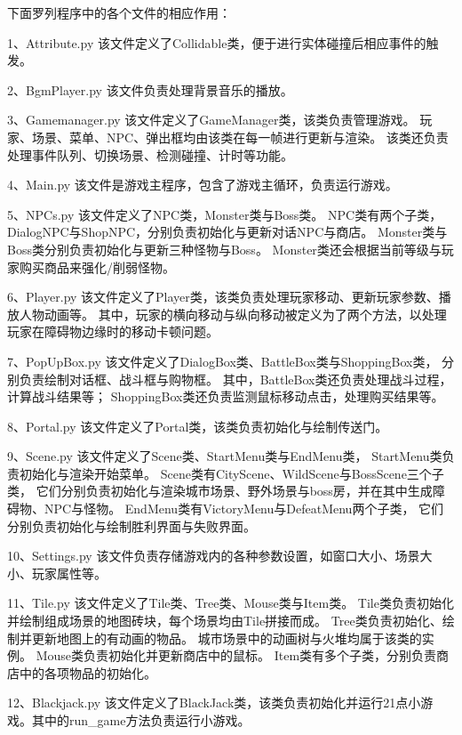 \documentclass{ctexart}
\begin{document}
下面罗列程序中的各个文件的相应作用：

    1、Attribute.py
      该文件定义了Collidable类，便于进行实体碰撞后相应事件的触发。

    2、BgmPlayer.py
      该文件负责处理背景音乐的播放。

    3、Gamemanager.py
      该文件定义了GameManager类，该类负责管理游戏。
      玩家、场景、菜单、NPC、弹出框均由该类在每一帧进行更新与渲染。
      该类还负责处理事件队列、切换场景、检测碰撞、计时等功能。

    4、Main.py
      该文件是游戏主程序，包含了游戏主循环，负责运行游戏。

    5、NPCs.py
      该文件定义了NPC类，Monster类与Boss类。
      NPC类有两个子类，DialogNPC与ShopNPC，分别负责初始化与更新对话NPC与商店。
      Monster类与Boss类分别负责初始化与更新三种怪物与Boss。
      Monster类还会根据当前等级与玩家购买商品来强化/削弱怪物。

    6、Player.py
      该文件定义了Player类，该类负责处理玩家移动、更新玩家参数、播放人物动画等。
      其中，玩家的横向移动与纵向移动被定义为了两个方法，以处理玩家在障碍物边缘时的移动卡顿问题。

    7、PopUpBox.py
      该文件定义了DialogBox类、BattleBox类与ShoppingBox类，
      分别负责绘制对话框、战斗框与购物框。
      其中，BattleBox类还负责处理战斗过程，计算战斗结果等；
      ShoppingBox类还负责监测鼠标移动点击，处理购买结果等。

    8、Portal.py
      该文件定义了Portal类，该类负责初始化与绘制传送门。

    9、Scene.py
      该文件定义了Scene类、StartMenu类与EndMenu类，
      StartMenu类负责初始化与渲染开始菜单。
      Scene类有CityScene、WildScene与BossScene三个子类，
      它们分别负责初始化与渲染城市场景、野外场景与boss房，并在其中生成障碍物、NPC与怪物。
      EndMenu类有VictoryMenu与DefeatMenu两个子类，
      它们分别负责初始化与绘制胜利界面与失败界面。

    10、Settings.py
      该文件负责存储游戏内的各种参数设置，如窗口大小、场景大小、玩家属性等。

    11、Tile.py
      该文件定义了Tile类、Tree类、Mouse类与Item类。
      Tile类负责初始化并绘制组成场景的地图砖块，每个场景均由Tile拼接而成。
      Tree类负责初始化、绘制并更新地图上的有动画的物品。
      城市场景中的动画树与火堆均属于该类的实例。
      Mouse类负责初始化并更新商店中的鼠标。
      Item类有多个子类，分别负责商店中的各项物品的初始化。

    12、Blackjack.py
      该文件定义了BlackJack类，该类负责初始化并运行21点小游戏。其中的run\_game方法负责运行小游戏。
      
\end{document}
